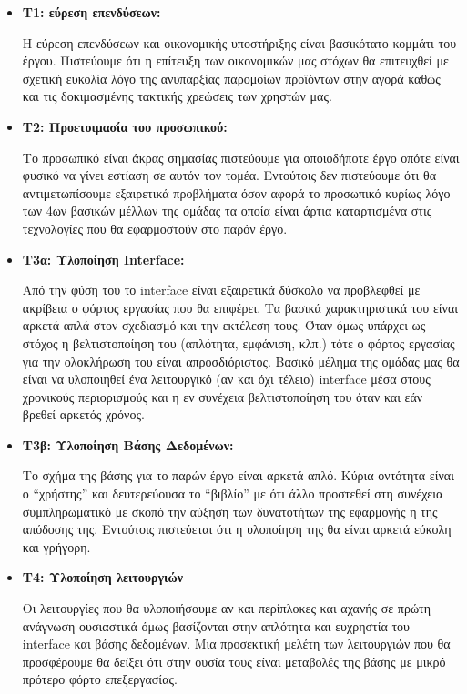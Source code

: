 \documentclass[12pt,a4paper]{article}
\begin{document}
\begin{itemize}
	\item \textbf{Τ1: εύρεση επενδύσεων:}

	Η εύρεση επενδύσεων και οικονομικής υποστήριξης είναι βασικότατο κομμάτι του έργου. Πιστεύουμε ότι η επίτευξη των οικονομικών μας στόχων θα επιτευχθεί με σχετική ευκολία λόγο της ανυπαρξίας παρομοίων προϊόντων στην αγορά καθώς και τις δοκιμασμένης τακτικής χρεώσεις των χρηστών μας.

	\item \textbf{Τ2: Προετοιμασία του προσωπικού:}

	Το προσωπικό είναι άκρας σημασίας πιστεύουμε για οποιοδήποτε έργο οπότε είναι φυσικό να γίνει εστίαση σε αυτόν τον τομέα. Εντούτοις δεν πιστεύουμε ότι θα αντιμετωπίσουμε εξαιρετικά προβλήματα όσον αφορά το προσωπικό κυρίως λόγο των 4ων βασικών μέλλων της ομάδας τα οποία είναι άρτια καταρτισμένα στις τεχνολογίες που θα εφαρμοστούν στο παρόν έργο.

	\item \textbf{Τ3α: Υλοποίηση Interface:}

	Από την φύση του το interface είναι εξαιρετικά δύσκολο να προβλεφθεί με ακρίβεια ο φόρτος εργασίας που θα επιφέρει. Τα βασικά χαρακτηριστικά του είναι αρκετά απλά στον σχεδιασμό και την εκτέλεση τους. Όταν όμως υπάρχει ως στόχος η βελτιστοποίηση του (απλότητα, εμφάνιση, κλπ.) τότε ο φόρτος εργασίας για την ολοκλήρωση του είναι απροσδιόριστος. Βασικό μέλημα της ομάδας μας θα είναι να υλοποιηθεί ένα λειτουργικό (αν και όχι τέλειο) interface μέσα στους χρονικούς περιορισμούς και η εν συνέχεια βελτιστοποίηση του όταν και εάν βρεθεί αρκετός χρόνος.

	\item \textbf{Τ3β: Υλοποίηση Βάσης Δεδομένων:}

	Το σχήμα της βάσης για το παρών έργο είναι αρκετά απλό. Κύρια οντότητα είναι ο “χρήστης” και δευτερεύουσα το “βιβλίο” με ότι άλλο προστεθεί στη συνέχεια συμπληρωματικό με σκοπό την αύξηση των δυνατοτήτων της εφαρμογής η της απόδοσης της. Εντούτοις πιστεύεται ότι η υλοποίηση της θα είναι αρκετά εύκολη και γρήγορη.

	\item \textbf{Τ4: Υλοποίηση λειτουργιών}

	Οι λειτουργίες που θα υλοποιήσουμε αν και περίπλοκες και αχανής σε πρώτη ανάγνωση ουσιαστικά όμως βασίζονται στην απλότητα και ευχρηστία του interface και βάσης δεδομένων. Μια προσεκτική μελέτη των λειτουργιών που θα προσφέρουμε θα δείξει ότι στην ουσία τους είναι μεταβολές της βάσης με μικρό πρότερο φόρτο επεξεργασίας.


\end{itemize}
\end{document}
